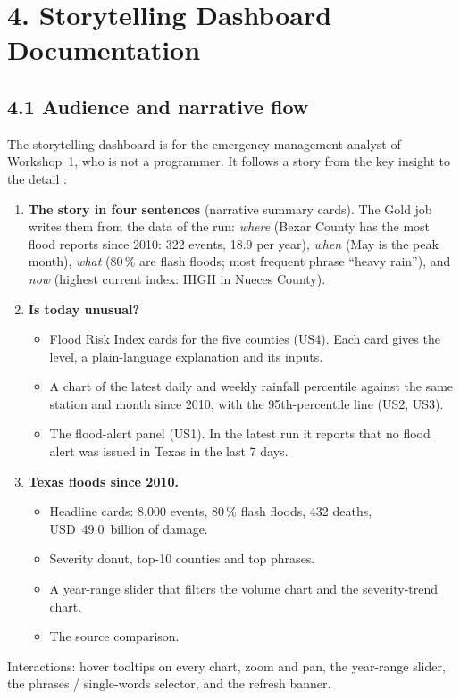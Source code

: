 \documentclass[stu, 12pt, letterpaper, donotrepeattitle, floatsintext, natbib]{apa7}
\begin{document}
\section{\large 4. Storytelling Dashboard Documentation}
\subsection{4.1 Audience and narrative flow}
The storytelling dashboard is for the emergency-management analyst of Workshop~1, who is not a programmer. It follows a story from the key insight to the detail \citep{knaflic2015}:
\begin{enumerate}
    \item \textbf{The story in four sentences} (narrative summary cards). The Gold job writes them from the data of the run: \emph{where} (Bexar County has the most flood reports since 2010: 322 events, 18.9 per year), \emph{when} (May is the peak month), \emph{what} (80\,\% are flash floods; most frequent phrase ``heavy rain''), and \emph{now} (highest current index: HIGH in Nueces County).
    \item \textbf{Is today unusual?}
    \begin{itemize}
        \item Flood Risk Index cards for the five counties (US4). Each card gives the level, a plain-language explanation and its inputs.
        \item A chart of the latest daily and weekly rainfall percentile against the same station and month since 2010, with the 95th-percentile line (US2, US3).
        \item The flood-alert panel (US1). In the latest run it reports that no flood alert was issued in Texas in the last 7 days.
    \end{itemize}
    \item \textbf{Texas floods since 2010.}
    \begin{itemize}
        \item Headline cards: 8,000 events, 80\,\% flash floods, 432 deaths, USD~49.0~billion of damage.
        \item Severity donut, top-10 counties and top phrases.
        \item A year-range slider that filters the volume chart and the severity-trend chart.
        \item The source comparison.
    \end{itemize}
\end{enumerate}
Interactions: hover tooltips on every chart, zoom and pan, the year-range slider, the phrases / single-words selector, and the refresh banner.
\end{document}

